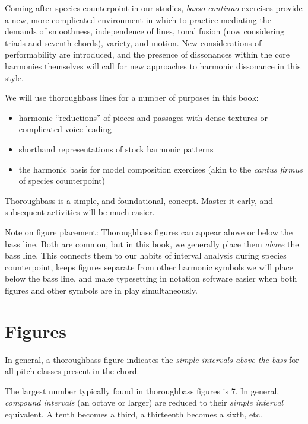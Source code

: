 \documentclass{book}
\providecommand{\tightlist}{%
  \setlength{\itemsep}{0pt}\setlength{\parskip}{0pt}}
\begin{document}
Coming after species counterpoint in our studies, \emph{basso continuo}
exercises provide a new, more complicated environment in which to practice
mediating the demands of smoothness, independence of lines, tonal fusion (now
considering triads and seventh chords), variety, and motion. New
considerations of performability are introduced, and the presence of
dissonances within the core harmonies themselves will call for new approaches
to harmonic dissonance in this style.

We will use thoroughbass lines for a number of purposes in this book:

\begin{itemize}
\tightlist
\item
  harmonic ``reductions'' of pieces and passages with dense textures or
  complicated voice-leading\\
\item
  shorthand representations of stock harmonic patterns\\
\item
  the harmonic basis for model composition exercises (akin to the \emph{cantus
  firmus} of species counterpoint)
\end{itemize}

Thoroughbass is a simple, and foundational, concept. Master it early, and
subsequent activities will be much easier.

Note on figure placement: Thoroughbass figures can appear above or below the
bass line. Both are common, but in this book, we generally place them
\emph{above} the bass line. This connects them to our habits of interval
analysis during species counterpoint, keeps figures separate from other
harmonic symbols we will place below the bass line, and make typesetting in
notation software easier when both figures and other symbols are in play
simultaneously.

\hypertarget{figures}{%
\section{Figures}\label{figures}}

In general, a thoroughbass figure indicates the \emph{simple intervals above
the bass} for all pitch classes present in the chord.

The largest number typically found in thoroughbass figures is 7. In general,
\emph{compound intervals} (an octave or larger) are reduced to their
\emph{simple interval} equivalent. A tenth becomes a third, a thirteenth
becomes a sixth, etc.
\end{document}

